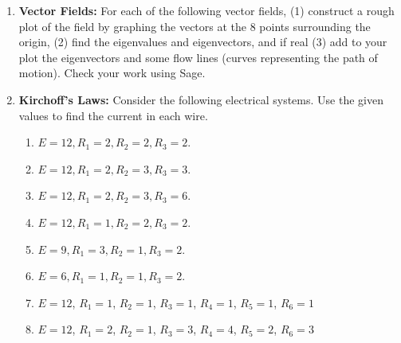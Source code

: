 \begin{enumerate}

\item  {\bf Vector Fields:} \label{vectorfields}For each of the following vector fields, (1) construct a rough plot of the field by graphing the vectors at the 8 points surrounding the origin, (2) find the eigenvalues and eigenvectors, and if real (3) add to your plot the eigenvectors and some flow lines (curves representing the path of motion). Check your work using Sage.
\begin{enumerate}
\end{enumerate}


\item  {\bf Kirchoff's Laws:} Consider the following electrical systems. Use the given values to find the current in each wire. \label{kirchoff}

\centerline{
}
\begin{multicols}{2}
\begin{enumerate}

\item $E=12, R_1=2,R_2=2, R_3=2$.
\item $E=12, R_1=2,R_2=3, R_3=3$.
\item $E=12, R_1=2,R_2=3, R_3=6$.
\item $E=12, R_1=1,R_2=2, R_3=2$.
\item $E=9, R_1=3,R_2=1, R_3=2$.
\item $E=6, R_1=1,R_2=1, R_3=2$.
\end{enumerate}
\end{multicols}


\begin{enumerate} \setcounter{enumii}{6}
\item $E=12$, $R_1=1$, $R_2=1$, $R_3=1$, $R_4=1$, $R_5=1$, $R_6=1$
\item $E=12$, $R_1=2$, $R_2=1$, $R_3=3$, $R_4=4$, $R_5=2$, $R_6=3$
\end{enumerate}



\end{enumerate}
